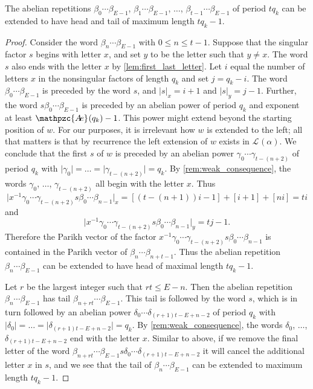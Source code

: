 \documentclass[a4paper,fleqn]{article}
\providecommand{\abs}[1]{\lvert#1\rvert}
\newcommand{\Lang}[2][]{\mathcal{L}_{#1}(#2)}
\newcommand{\abexp}[2][]{\mathpzc{A\mkern-3mu e}_{#1}(#2)}
\begin{document}
  \begin{claim}\label{cl:extension}
    The abelian repetitions $\beta_0 \cdots \beta_{E-1}$, $\beta_1 \cdots \beta_{E-1}$, $\ldots$,
    $\beta_{t-1} \cdots \beta_{E-1}$ of period $tq_k$ can be extended to have head and tail of maximum length
    $tq_k - 1$.
  \end{claim}
  \begin{proof}
    Consider the word $\beta_n \cdots \beta_{E-1}$ with $0 \leq n \leq t - 1$. Suppose that the singular factor $s$
    begins with letter $x$, and set $y$ to be the letter such that $y \neq x$. The word $s$ also ends with
    the letter $x$ by \autoref{lem:first_last_letter}. Let $i$ equal the number of letters $x$ in the nonsingular
    factors of length $q_k$ and set $j = q_k - i$. The word $\beta_0 \cdots \beta_{E-1}$ is preceded by the word $s$,
    and $\abs{s}_x = i + 1$ and $\abs{s}_y = j - 1$. Further, the word $s \beta_0 \cdots \beta_{E-1}$ is preceded by an
    abelian power of period $q_k$ and exponent at least $\abexp{q_k} - 1$. This power might extend beyond the starting
    position of $w$. For our purposes, it is irrelevant how $w$ is extended to the left; all that matters is that by
    recurrence the left extension of $w$ exists in $\Lang{\alpha}$. We conclude that the first $s$ of $w$ is preceded
    by an abelian power $\gamma_0 \cdots \gamma_{t - (n + 2)}$ of period $q_k$ with
    $\abs{\gamma_0} = \ldots = \abs{\gamma_{t - (n + 2)}} = q_k$. By \autoref{rem:weak_consequence}, the words
    $\gamma_0$, $\ldots$, $\gamma_{t - (n + 2)}$ all begin with the letter $x$. Thus
    \begin{equation*}
      \abs{x^{-1}\gamma_0 \cdots \gamma_{t - (n + 2)} s \beta_0 \cdots \beta_{n-1}}_x = [(t - (n + 1))i - 1] + [i + 1] + [ni] = ti
    \end{equation*}
    and
    \begin{equation*}
      \abs{x^{-1}\gamma_0 \cdots \gamma_{t - (n + 2)} s \beta_0 \cdots \beta_{n-1}}_y = tj - 1.
    \end{equation*}
    Therefore the Parikh vector of the factor $x^{-1}\gamma_0 \cdots \gamma_{t - (n + 2)} s \beta_0 \cdots \beta_{n-1}$
    is contained in the Parikh vector of $\beta_n \cdots \beta_{n + t - 1}$. Thus the abelian repetition 
    $\beta_n \cdots \beta_{E-1}$ can be extended to have head of maximal length $tq_k - 1$.

    Let $r$ be the largest integer such that $rt \leq E - n$. Then the abelian repetition $\beta_n \cdots \beta_{E-1}$
    has tail $\beta_{n + rt} \cdots \beta_{E-1}$. This tail is followed by the word $s$, which is in turn followed by
    an abelian power $\delta_0 \cdots \delta_{(r+1)t - E + n - 2}$ of period $q_k$ with
    $\abs{\delta_0} = \ldots = \abs{\delta_{(r+1)t - E + n - 2}} = q_k$. By \autoref{rem:weak_consequence}, the words
    $\delta_0$, $\ldots$, $\delta_{(r+1)t - E + n - 2}$ end with the letter $x$. Similar to above, if we remove the
    final letter of the word $\beta_{n + rt} \cdots \beta_{E-1} s \delta_0 \cdots \delta_{(r+1)t - E + n - 2}$ it will
    cancel the additional letter $x$ in $s$, and we see that the tail of $\beta_n \cdots \beta_{E-1}$ can be extended
    to maximum length $tq_k - 1$.
  \end{proof}
\end{document}
